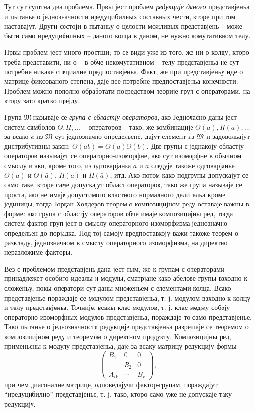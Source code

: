 ﻿\documentclass[11pt]{article}
\begin{document}
Тут сут суштна два проблема. Првы јест проблем \emph{редукције даного} представјеньа и пытанье о једнозначности иредуцибилных составных чести, кторе при том наставајут. Други состоји в пытаньу о целости можливых представјень -- може быти само иредуцибилных -- даного колца в даном, не нужно комутативном телу.

Првы проблем јест много простши; то се види уже из того, же ни о колцу, кторо треба представити, ни о -- в обче некомутативном -- телу представјеньа не сут потребне никаке специалне предпоставјеньа. Факт, же при представјеньу иде о матрице фиксованого степена, даје все потребне предпоставјеньа конечности. Проблем можно пополно обработати посредством теорије груп с операторами, на ктору зато кратко прејду.

Група $\mathfrak{M}$ называје се \emph{група с областју операторов}, ако Једночасно даны јест систем симболов $\Theta,H,\ldots$ -- операторов -- тако, же комбинације $\Theta(a),H(a),\ldots$ за всако $a$ из $\mathfrak{M}$ сут једнозначно определьене, дајут елемент из $\mathfrak{M}$ и задовольајут дистрибутивны закон: $\Theta(ab)=\Theta(a)\Theta(b)$. Две групы с једнакоју областју операторов называјут се операторно-изоморфне, ако сут изоморфне в обычном смыслу и ако, кроме того, из одговарјаньа $a$ и $\bar a$ следује такоже одговарјанье $\Theta(a)$ и $\Theta(\bar a)$, $H(a)$ и $H(\bar a)$, итд. Ако потом како подгрупы допускајут се само таке, кторе саме допускајут област операторов, тако же група называје се проста, ако не имаје допустимого властного нормалного делительа кроме јединицы, тогда Јордан-Холдеров теорем о композицијном реду оставаје важны в форме: ако група с областју операторов обче имаје композицијны ред, тогда систем фактор-груп јест в смыслу операторного изоморфизма једнозначно определьен до порјадка. Под тој самоју предпоставкоју важи такоже теорем о разкладу, једнозначном в смыслу операторного изоморфизма, на директно неразложиме факторы.

Вез с проблемом представјень дана јест тым, же к групам с операторами принадлежет особито идеалы и модулы, сматрјане како абелове групы взходно к сложеньу, покы оператори сут даны множеньем с елементами колца. Всако представјенье пораждаје се модулом представјеньа, т. ј. модулом взходно к колцу и телу представјеньа. Точније, всакы клас модулов, т. ј. клас меджу собоју операторно-изоморфных модулов представјеньа, пораждаје то само представјенье. Тако пытанье о једнозначности редукције представјеньа разрешаје се теоремом о композицијном реду и теоремом о директном продукту. Композицијны ред, применьены к модулу представјеньа, даје за всаку матрицу редукцију формы
\[
\begin{pmatrix}
B_1&0&0\\
&B_2&0\\
A_{ik}&\cdots&B_r
\end{pmatrix},
\]
при чем диагоналне матрице, одповедајучи фактор-групам, пораждајут “иредуцибилно” представјенье, т. ј. тако, кторо само уже не допускаје таку редукцију.
\end{document}
